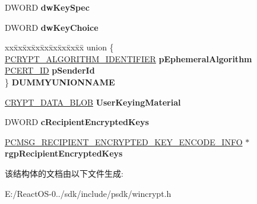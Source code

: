 \begin{DoxyCompactItemize}
\mbox{\label{struct___c_m_s_g___k_e_y___a_g_r_e_e___r_e_c_i_p_i_e_n_t___e_n_c_o_d_e___i_n_f_o_a2e9eaa25f91b329bfe09a4fa004c861d}} 
D\+W\+O\+RD {\bfseries dw\+Key\+Spec}
\item 
\mbox{\label{struct___c_m_s_g___k_e_y___a_g_r_e_e___r_e_c_i_p_i_e_n_t___e_n_c_o_d_e___i_n_f_o_abfe00ba6890628e8a29e668a8737d4d8}} 
D\+W\+O\+RD {\bfseries dw\+Key\+Choice}
\item 
\mbox{\label{struct___c_m_s_g___k_e_y___a_g_r_e_e___r_e_c_i_p_i_e_n_t___e_n_c_o_d_e___i_n_f_o_ac4c5bb7a1f6f5e6ac7df9ae668f476db}} 
\begin{tabbing}
xx\=xx\=xx\=xx\=xx\=xx\=xx\=xx\=xx\=\kill
union \{\\
\>\hyperlink{struct___c_r_y_p_t___a_l_g_o_r_i_t_h_m___i_d_e_n_t_i_f_i_e_r}{PCRYPT\_ALGORITHM\_IDENTIFIER} {\bfseries pEphemeralAlgorithm}\\
\>\hyperlink{struct___c_e_r_t___i_d}{PCERT\_ID} {\bfseries pSenderId}\\
\} {\bfseries DUMMYUNIONNAME}\\

\end{tabbing}\item 
\mbox{\label{struct___c_m_s_g___k_e_y___a_g_r_e_e___r_e_c_i_p_i_e_n_t___e_n_c_o_d_e___i_n_f_o_af78d6b4745d6d6fc7fd51aee95cef95f}} 
\hyperlink{struct___c_r_y_p_t_o_a_p_i___b_l_o_b}{C\+R\+Y\+P\+T\+\_\+\+D\+A\+T\+A\+\_\+\+B\+L\+OB} {\bfseries User\+Keying\+Material}
\item 
\mbox{\label{struct___c_m_s_g___k_e_y___a_g_r_e_e___r_e_c_i_p_i_e_n_t___e_n_c_o_d_e___i_n_f_o_a354d626530ae4f457563bf061b958f09}} 
D\+W\+O\+RD {\bfseries c\+Recipient\+Encrypted\+Keys}
\item 
\mbox{\label{struct___c_m_s_g___k_e_y___a_g_r_e_e___r_e_c_i_p_i_e_n_t___e_n_c_o_d_e___i_n_f_o_a63f0fd788a191ae2312b524fc2e6a51e}} 
\hyperlink{struct___c_m_s_g___r_e_c_i_p_i_e_n_t___e_n_c_r_y_p_t_e_d___k_e_y___e_n_c_o_d_e___i_n_f_o}{P\+C\+M\+S\+G\+\_\+\+R\+E\+C\+I\+P\+I\+E\+N\+T\+\_\+\+E\+N\+C\+R\+Y\+P\+T\+E\+D\+\_\+\+K\+E\+Y\+\_\+\+E\+N\+C\+O\+D\+E\+\_\+\+I\+N\+FO} $\ast$ {\bfseries rgp\+Recipient\+Encrypted\+Keys}
\end{DoxyCompactItemize}


该结构体的文档由以下文件生成\+:\begin{DoxyCompactItemize}
\item 
E\+:/\+React\+O\+S-\/0../sdk/include/psdk/wincrypt.\+h\end{DoxyCompactItemize}
